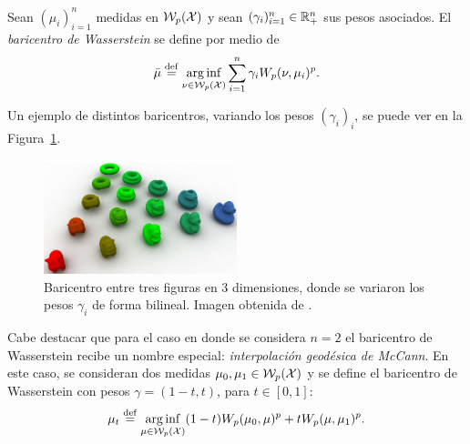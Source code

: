 \begin{definition}\label{def:baricentroWasserstein}
	Sean $(\mu_{i})_{i=1}^{n}$ medidas en $\WassersteinSpace[p]{\cX} $ y sean $(\gamma_{i})_{i=1}^{n} \in \R_+^n$ sus pesos asociados. El \emph{baricentro de Wasserstein} se define por medio de
	\begin{equation}
		\bar \mu \eqdef \arginf_{\nu \in \WassersteinSpace[p]{\cX} } \sum_{i=1}^{n} \gamma_i \Wasserstein[p]{\nu}{\mu_i}^p.
	\end{equation}

\end{definition}

Un ejemplo de distintos baricentros, variando los pesos $(\gamma_i)_i$, se puede ver en la Figura~\ref{fig:baricentro-Wass-3d}.

\begin{figure}[htbp]
	\centering
	\includegraphics[width=0.5\textwidth]{img/transporte/baricentro-Wass-3d.png}
	\caption{Baricentro entre tres figuras en 3 dimensiones, donde se variaron los pesos $\gamma_i$ de forma bilineal. Imagen obtenida de \cite{solomon2015convolutional}.}
	\label{fig:baricentro-Wass-3d}
\end{figure}


Cabe destacar que para el caso en donde se considera $n = 2$ el baricentro de Wasserstein recibe un nombre especial: \textit{interpolación geodésica de McCann}. En este caso, se consideran dos medidas $\mu_0, \mu_1 \in \WassersteinSpace[p]{\cX} $ y se define el baricentro de Wasserstein con pesos $\gamma = (1 - t, t)$, para $t \in [0, 1]$:
\begin{equation}\label{eq:interpolacion-geodesica}
	\mu_t \eqdef \arginf_{\mu \in \WassersteinSpace[p]{\cX} }  (1-t) \Wasserstein[p]{\mu_0}{\mu}^p + t \Wasserstein[p]{\mu}{\mu_1}^p .
\end{equation}





